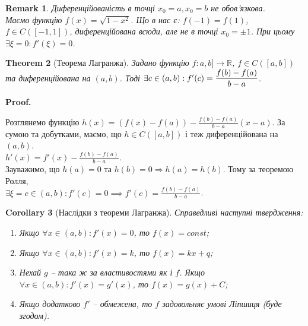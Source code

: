 \documentclass[a4paper, 14pt]{article}
\makeatletter
\def\qed{$\blacksquare$}
\theoremstyle{theoremdd}
\newtheorem{theorem}{Theorem}[subsection]
\theoremstyle{theoremdd}
\theoremstyle{theoremdd}
\theoremstyle{theoremdd}
\theoremstyle{theoremdd}
\theoremstyle{theoremdd}
\newtheorem{remark}[theorem]{Remark}
\theoremstyle{theoremdd}
\theoremstyle{theoremdd}
\newtheorem{corollary}[theorem]{Corollary}
\renewenvironment{proof}[1][Proof.\\]{\par
\pushQED{\hfill \qed}%
\normalfont \topsep6\p@\@plus6\p@\relax
\trivlist
\item\relax
{\bfseries
#1\@addpunct{.}}\hspace\labelsep\ignorespaces
}{%
\popQED\endtrivlist\@endpefalse
}
\makeatother
\begin{document}
\begin{remark}
Диференційованість в точці $x_0=a,x_0=b$ не обов'язкова.\\
Маємо функцію $f(x) = \sqrt{1-x^2}$. Що в нас є: $f(-1) = f(1)$, $f \in C([-1,1])$, диференційована всюди, але не в точці $x_0 = \pm 1$. При цьому $\exists \xi = 0: f'(\xi) = 0$.
\end{remark}

\begin{theorem}[Теорема Лагранжа]
Задано функцію $f \colon a,b] \to \mathbb{R}$, $f \in C([a,b])$ та диференційована на $(a,b)$. Тоді $\exists c \in (a,b): \\ f'(c) = \displaystyle \frac{f(b)-f(a)}{b-a}$.
\end{theorem}

\begin{proof}
Розглянемо функцію $h(x) = \displaystyle (f(x)-f(a))- \frac{f(b)-f(a)}{b-a}(x-a)$. За сумою та добутками, маємо, що $h \in C([a,b])$ і теж диференційована на $(a,b)$.\\
$h'(x) = \displaystyle f'(x) - \frac{f(b)-f(a)}{b-a}$.\\
Зауважимо, що $h(a) = 0$ та $h(b) = 0 \Rightarrow h(a) = h(b)$. Тому за теоремою Ролля, \\
$\exists \xi = c \in (a,b): f'(c) = 0 \implies f'(c) = \displaystyle \frac{f(b)-f(a)}{b-a}$.
\\ \iffalse %
\begin{figure}[H]
\centering
\begin{tikzpicture}
\draw[thick,->] (-0.5,0)--(4.5,0) node[anchor=north west] {$x$};
\draw[thick,->] (0,-0.5)--(0,2.5) node[anchor=east] {$y$};
\draw [thick] plot [smooth] coordinates {(0.8,0.5) (2, 1.5) (3, 0.9) (4, 2)} node[anchor = south] {$f(x)$};
\draw[dashed] (0.8,0.5)--(4,2);
\draw[thick, red] (0.8,0.5+0.45)--(3,1.98125);
\node at (0.8,-0.2) {$a$}; \node at (4,-0.2) {$b$};
\draw (4,-1pt)--(4,1pt); \draw (0.8,-1pt)--(0.8,1pt);
\draw[dashed] (2,1.5)--(2,0) node at (2,-0.2) {$c$};
\end{tikzpicture}
\caption*{Для $f$ в т. $c$ проведемо дотичну. І в цій точці відрізок, що сполучає початкову та кінцеву точку, буде паралельна дотичній.}
\end{figure}
\fi %
\end{proof}

\begin{corollary}[Наслідки з теореми Лагранжа]
Справедливі наступні твердження:
\begin{enumerate}[nosep,wide=0pt,label={\arabic*)}]
\item Якщо $\forall x \in (a,b): f'(x) = 0$, то $f(x) = const$;
\item Якщо $\forall x \in (a,b): f'(x) = k$, то $f(x) = kx + q$;
\item Нехай $g$ -- така ж за властивостями як і $f$. Якщо $\forall x \in (a,b): f'(x) = g'(x)$, то $f(x) = g(x) + C$;
\item Якщо додатково $f'$ -- обмежена, то $f$ задовольняє умові Ліпшиця (буде згодом).
\end{enumerate}
\end{corollary}
\end{document}
